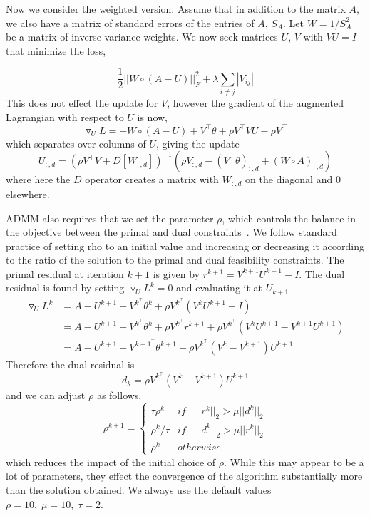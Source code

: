 \documentclass{article}
\begin{document}
Now we consider the weighted version. Assume that in addition to the matrix $A$, we
also have a matrix of standard errors of the entries of $A$, $S_A$. Let
$W = 1/S_A^2$ be a matrix of inverse variance weights. We now
seek matrices $U$, $V$ with $VU=I$ that minimize the loss,

\begin{equation}\label{opt_weights}
\frac{1}{2} || W \circ (A - U)||_F^2 + \lambda \sum_{i\neq j}|V_{ij}|
\end{equation}
This does not effect the update for $V$, however the gradient of the augmented
Lagrangian with respect to $U$ is now,
\begin{equation*}
\triangledown_U L = - W \circ (A- U) + V^\top \theta + \rho V^\top V U - \rho V^\top
\end{equation*}
which separates over columns of $U$, giving the update
\begin{equation}
U_{:, d} = (\rho V^\top V + D[W_{:, d}])^{-1}(\rho V^\top_{:, d} -
  (V^\top \theta)_{:, d} + (W \circ A)_{:, d})
\end{equation}
where here the $D$ operator creates a matrix with $W_{:, d}$ on the
diagonal and 0 elsewhere.


ADMM also requires that we set the parameter $\rho$, which controls the
balance in the objective between the primal and dual constraints~\cite{Boyd2010}. We
follow standard practice of setting rho to an initial value and increasing
or decreasing it according to the ratio of the solution to the primal
and dual feasibility constraints. The primal residual at iteration $k+1$ is
given by $r^{k+1} = V^{k+1} U^{k+1} - I$. The dual residual is found by
setting $\triangledown_{U} L^k = 0$ and evaluating it at $U_{k+1}$
\begin{align*}
\triangledown_U L^{k} &= A - U^{k+1} + V^{k^\top} \theta^k + \rho V^{k^\top}(V^k U^{k+1}-I) \\
  &= A - U^{k+1} + V^{k^\top} \theta^k + \rho V^{k^\top}r^{k+1} + \rho V^{k^\top}(V^k U^{k+1}-V^{k+1} U^{k+1}) \\
  &= A - U^{k+1} + V^{k+1^\top} \theta^{k+1} + \rho V^{k^\top}(V^k - V^{k+1})U^{k+1}
\end{align*}
Therefore the dual residual is~\cite{Boyd2010}
\begin{equation*}
d_k = \rho V^{k^\top}(V^k - V^{k+1})U^{k+1}
\end{equation*}
and we can adjust $\rho$ as follows,
\begin{equation*}
\rho^{k+1} = \left\{ \begin{array}{ll}
  \tau \rho^k & if\quad ||r^k||_2 > \mu ||d^k||_2 \\
  \rho^k/\tau & if\quad ||d^k||_2 > \mu ||r^k||_2 \\
  \rho^k & otherwise \end{array} \right.
\end{equation*}
which reduces the impact of the initial choice of $\rho$. While this
may appear to be a lot of parameters, they effect the convergence of
the algorithm substantially more than the solution obtained.
We always use the default values $\rho = 10,\;\mu = 10,\;\tau = 2$.
\end{document}
